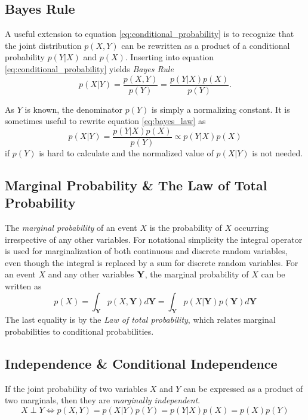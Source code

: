 \subsection{Bayes Rule}

A useful extension to equation \eqref{eq:conditional_probability} is to recognize that the joint distribution $p(X, Y)$ can be rewritten as a product of a conditional probability $p(Y | X)$ and $p(X)$. Inserting into equation \eqref{eq:conditional_probability} yields \textit{Bayes Rule}
\begin{equation}\label{eq:bayes_law}
    p(X | Y) = \frac{p(X, Y)}{p(Y)} = \frac{p(Y | X)p(X)}{p(Y)}.
\end{equation}

As $Y$ is known, the denominator $p(Y)$ is simply a normalizing constant. It is sometimes useful to rewrite equation \eqref{eq:bayes_law} as
\begin{equation}\label{eq:bayes_law_proportional}
    p(X | Y) = \frac{p(Y | X) p(X)}{p(Y)} \propto p(Y | X)p(X)
\end{equation} 
if $p(Y)$ is hard to calculate and the normalized value of $p(X | Y)$ is not needed.

\subsection{Marginal Probability \& The Law of Total Probability}
The \textit{marginal probability} of an event $X$ is the probability of $X$ occurring irrespective of any other variables.
For notational simplicity the integral operator is used for marginalization of both continuous and discrete random variables, even though the integral is replaced by a sum for discrete random variables. For an event $X$ and any other variables $\bf Y$, the marginal probability of $X$ can be written as
\begin{equation}
    p(X) = \int_{\boldsymbol{Y}} p(X, \boldsymbol{Y}) d\boldsymbol{Y} = \int_{\boldsymbol{Y}} p(X | \boldsymbol{Y}) p(\boldsymbol{Y}) d\boldsymbol{Y}
\end{equation}
The last equality is by the \textit{Law of total probability}, which relates marginal probabilities to conditional probabilities.

\subsection{Independence \& Conditional Independence}
If the joint probability of two variables $X$ and $Y$ can be expressed as a product of two marginals, then they are \textit{marginally independent}.
\begin{equation}
    X \perp Y \iff p(X, Y) = p(X | Y)p(Y) = p(Y | X)p(X) = p(X)p(Y)
\end{equation}

